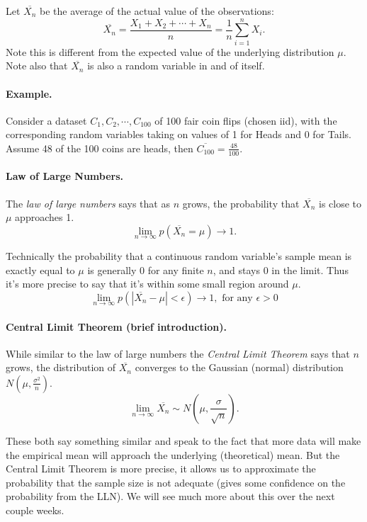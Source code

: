 Let $\overline{X_n}$ be the average of the actual value of the observations:
\[\overline{X_n} = \frac{X_1 + X_2 + \cdots + X_n}{n} = \frac{1}{n} \sum_{i=1}^n X_i.\]
Note this is different from the expected value of the underlying distribution $\mu$.
Note also that $\overline{X_n}$ is also a random variable in and of itself. 

\paragraph{Example. }
Consider a dataset $C_1, C_2,\cdots,C_{100}$ of 100 fair coin flips (chosen iid), with the corresponding random variables 
taking on values of 1 for Heads and 0 for Tails. 
Assume 48 of the 100 coins are heads, then $\overline{C_{100}} = \frac{48}{100}$. 


\paragraph{Law of Large Numbers.} The \emph{law of large numbers} says that as $n$ grows, the probability that $\overline{X_n}$ is close to $\mu$ approaches 1. 
\[\lim_{n\rightarrow\infty} p\left(\overline{X_n}=\mu\right) \to 1.\]

\begin{aside}
Technically the probability that a continuous random variable's sample mean 
is exactly equal to $\mu$ is generally 0 for any finite $n$, and stays 0 in the limit.
Thus it's more precise to say that it's within some small region around $\mu$. 
\[\lim_{n\rightarrow\infty} p(|\overline{X_n}-\mu| < \epsilon) \to 1, \text{ for any } \epsilon > 0\]
\end{aside}

\paragraph{Central Limit Theorem (brief introduction).} While similar to the law of large numbers the \emph{Central Limit Theorem} says that $n$ grows, 
the distribution of $\overline{X_n}$ converges to the Gaussian (normal) distribution $N\left(\mu, \frac{\sigma^2}{n}\right)$. 
\[\lim_{n\rightarrow\infty} \overline{X_n} \sim N\left(\mu, \frac{\sigma}{\sqrt{n}}\right).\]

These both say something similar and speak to the fact that more data will make the empirical mean will approach the underlying (theoretical) mean. 
But the Central Limit Theorem is more precise, it allows us to approximate the probability that the sample size is not adequate 
(gives some confidence on the probability from the LLN).
We will see much more about this over the next couple weeks. 

